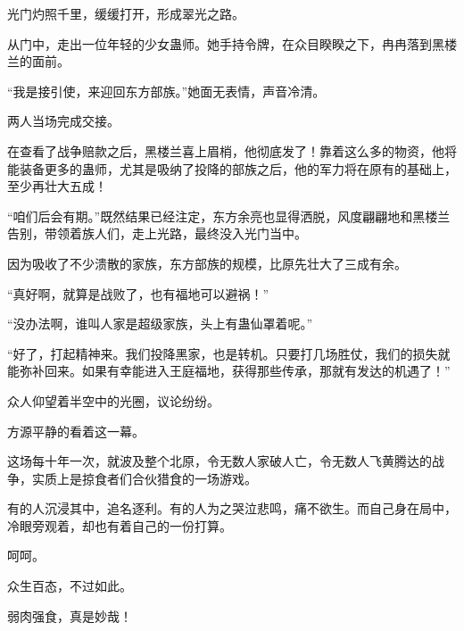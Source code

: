 \begin{this_body}
光门灼照千里，缓缓打开，形成翠光之路。

从门中，走出一位年轻的少女蛊师。她手持令牌，在众目睽睽之下，冉冉落到黑楼兰的面前。

“我是接引使，来迎回东方部族。”她面无表情，声音冷清。

两人当场完成交接。

在查看了战争赔款之后，黑楼兰喜上眉梢，他彻底发了！靠着这么多的物资，他将能装备更多的蛊师，尤其是吸纳了投降的部族之后，他的军力将在原有的基础上，至少再壮大五成！

“咱们后会有期。”既然结果已经注定，东方余亮也显得洒脱，风度翩翩地和黑楼兰告别，带领着族人们，走上光路，最终没入光门当中。

因为吸收了不少溃散的家族，东方部族的规模，比原先壮大了三成有余。

“真好啊，就算是战败了，也有福地可以避祸！”

“没办法啊，谁叫人家是超级家族，头上有蛊仙罩着呢。”

“好了，打起精神来。我们投降黑家，也是转机。只要打几场胜仗，我们的损失就能弥补回来。如果有幸能进入王庭福地，获得那些传承，那就有发达的机遇了！”

众人仰望着半空中的光圈，议论纷纷。

方源平静的看着这一幕。

这场每十年一次，就波及整个北原，令无数人家破人亡，令无数人飞黄腾达的战争，实质上是掠食者们合伙猎食的一场游戏。

有的人沉浸其中，追名逐利。有的人为之哭泣悲鸣，痛不欲生。而自己身在局中，冷眼旁观着，却也有着自己的一份打算。

呵呵。

众生百态，不过如此。

弱肉强食，真是妙哉！

\end{this_body}

